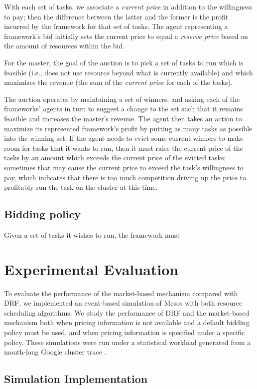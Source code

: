 \documentclass{acm_proc_article-sp}
\begin{document}
With each set of tasks, we associate a \emph{current price} in addition to the
willingness to pay; then the difference between the latter and the former is the
profit incurred by the framework for that set of tasks. The agent representing a
framework's bid initially sets the current price to equal a \emph{reserve price}
based on the amount of resources within the bid.

For the master, the goal of the auction is to pick a set of tasks to run which
is feasible (i.e., does not use resource beyond what is currently available) and
which maximizes the revenue (the sum of the \emph{current price} for each of the
tasks).

The auction operates by maintaining a set of winners, and asking each of
the frameworks' agents in turn to suggest a change to the set such that it
remains feasible and increases the master's revenue. The agent then takes an
action to maximize its represented framework's profit by putting as many tasks
as possible into the winning set. If the agent needs to evict some current
winners to make room for tasks that it wants to run, then it must raise the
current price of the tasks by an amount which exceeds the current price of the
evicted tasks; sometimes that may cause the current price to exceed the task's
willingness to pay, which indicates that there is too much competition driving
up the price to profitably run the task on the cluster at this time.

\subsection{Bidding policy}
Given a set of tasks it wishes to run, the framework must 

\section{Experimental Evaluation}
\label{sec:eval}

To evaluate the performance of the market-based mechanism compared with DRF,
we implemented an event-based simulation of Mesos with both resource scheduling algorithms.
We study the performance of DRF and the market-based mechanism both when pricing information is not available and a default bidding policy must be used, and when pricing information is specified under a specific policy. These simulations were run under a statistical workload generated from a month-long Google cluster trace \cite{TODO}.

\subsection{Simulation Implementation\\}
\end{document}

